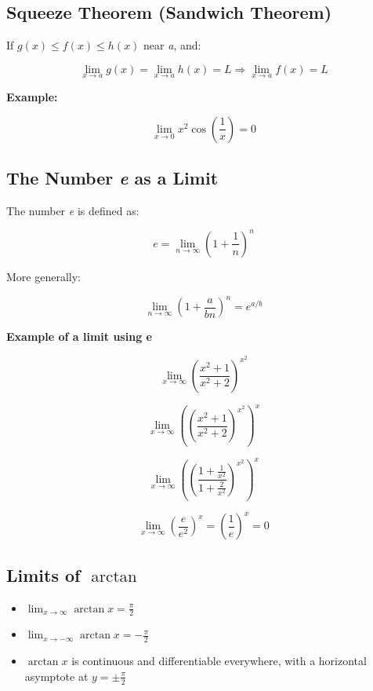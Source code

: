 \subsection{Squeeze Theorem (Sandwich Theorem)}

If \(g(x) \le f(x) \le h(x)\) near \emph{a}, and:

\[
    \lim_{x \to a} g(x) = \lim_{x \to a} h(x) = L
    \Rightarrow \lim_{x \to a} f(x) = L
\]

\textbf{Example:}

\[
    \lim_{x \to 0} x^2 \cos\left( \frac{1}{x} \right) = 0
\]

\subsection{The Number \texorpdfstring{\emph{e}}{e} as a Limit}

The number \emph{e} is defined as:

\[
    e = \lim_{n \to \infty} {\left(1 + \frac{1}{n} \right)}^n
\]

More generally:

\[
    \lim_{n \to \infty} {\left(1 + \frac{a}{bn} \right)}^n = e^{a/b}
\]

\textbf{Example of a limit using e}

\[
    \lim_{x \to \infty}{\left(\frac{x^2 + 1}{x^2 +2}\right)}^{x^2}
\]

\[
    \lim_{x \to \infty} {\left({\left(\frac{x^2 + 1}{x^2 +2}\right)}^{x^2}\right)}^x
\]

\[
    \lim_{x \to \infty} {\left({\left(\frac{1 + \frac{1}{x^2}}{1 + \frac{2}{x^2}}\right)}^{x^2}\right)}^x
\]

\[
    \lim_{x \to \infty} {\left(\frac{e}{e^2}\right)}^x = {\left(\frac{1}{e}\right)}^x = 0
\]


\subsection{Limits of \texorpdfstring{\(\arctan\)}{arctan}}

\begin{itemize}

    \item \(\displaystyle \lim_{x \to \infty} \arctan x = \frac{\pi}{2}\)

    \item \(\displaystyle \lim_{x \to -\infty} \arctan x = -\frac{\pi}{2}\)


    \item \(\arctan x\) is continuous and differentiable everywhere, with a horizontal asymptote at 
    \(y = \pm \frac{\pi}{2}\)

\end{itemize}

